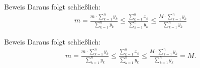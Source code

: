 \documentclass[10pt]{beamer}
\begin{document}
\begin{frame}{Beweis}
     Daraus folgt schließlich:
     \begin{align*}
         m
         = \frac{m \cdot \sum_{k = 1}^{n} y_{k}}{\sum_{k = 1}^{n} y_{k}}
         \leq \frac{\sum_{k = 1}^{n} x_{k}}{\sum_{k = 1}^{n} y_{k}}
         \leq \frac{M \cdot \sum_{k = 1}^{n} y_{k}}{\sum_{k = 1}^{n} y_{k}}
     \end{align*}
\end{frame}



\begin{frame}{Beweis}
     Daraus folgt schließlich:
     \begin{align*}
         m
         = \frac{m \cdot \sum_{k = 1}^{n} y_{k}}{\sum_{k = 1}^{n} y_{k}}
         \leq \frac{\sum_{k = 1}^{n} x_{k}}{\sum_{k = 1}^{n} y_{k}}
         \leq \frac{M \cdot \sum_{k = 1}^{n} y_{k}}{\sum_{k = 1}^{n} y_{k}}
         = M.
     \end{align*}
\end{frame}
\end{document}
